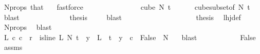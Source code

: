 \begin{isabellebody}
\ N{\isacharunderscore}{\kern0pt}props{\isacharparenleft}{\kern0pt}{}{\isacharparenright}{\kern0pt}\ that\ {}\ \isamarkupfalse%
\ fastforce\ \ \isanewline
\ \ \ \ \ \ \ \ \ \ \isamarkupfalse%
\ \isamarkupfalse%
\ {\isachardoublequoteopen}cube\ N{\isacharprime}{\kern0pt}\ {\isacharparenleft}{\kern0pt}t\ {\isacharplus}{\kern0pt}\ {}{\isacharparenright}{\kern0pt}\ {\isasymnoteq}\ {\isacharbraceleft}{\kern0pt}{\isacharbraceright}{\kern0pt}{\isachardoublequoteclose}\ \isamarkupfalse%
\ cube{\isacharunderscore}{\kern0pt}subset{\isacharbrackleft}{\kern0pt}of\ N{\isacharprime}{\kern0pt}\ t{\isacharbrackright}{\kern0pt}\ \isamarkupfalse%
\ blast\isanewline
\ \ \ \ \ \ \ \ \ \ \isamarkupfalse%
\ \isamarkupfalse%
\ {\isacharquery}{\kern0pt}thesis\ \isamarkupfalse%
\ {}\ \isamarkupfalse%
\ blast\isanewline
\ \ \ \ \ \ \ \ \isamarkupfalse%
\isanewline
\ \ \ \ \ \ \ \ \isamarkupfalse%
\ \isamarkupfalse%
\ {\isacharquery}{\kern0pt}thesis\ \isamarkupfalse%
\ lhj{\isacharunderscore}{\kern0pt}def\ \isamarkupfalse%
\ N{\isacharunderscore}{\kern0pt}props{\isacharparenleft}{\kern0pt}{}{\isacharparenright}{\kern0pt}\ \isamarkupfalse%
\ blast\isanewline
\ \ \ \ \ \ \isamarkupfalse%
\isanewline
\ \ \ \ \ \ \ \ \isamarkupfalse%
\ {}\isanewline
\ \ \ \ \ \ \ \ \isamarkupfalse%
\ \isamarkupfalse%
\ {\isachardoublequoteopen}{\isacharparenleft}{\kern0pt}{\isasymexists}L\ c{\isachardot}{\kern0pt}\ c\ {\isacharless}{\kern0pt}\ r\ {\isasymand}\ is{\isacharunderscore}{\kern0pt}line\ L\ N{\isacharprime}{\kern0pt}\ t\ {\isasymand}\ {\isacharparenleft}{\kern0pt}{\isasymforall}y\ {\isasymin}\ L\ {\isacharbackquote}{\kern0pt}\ {\isacharbraceleft}{\kern0pt}{\isachardot}{\kern0pt}{\isachardot}{\kern0pt}{\isacharless}{\kern0pt}t{\isacharbraceright}{\kern0pt}{\isachardot}{\kern0pt}\ {\isasymchi}\ y\ {\isacharequal}{\kern0pt}\ c{\isacharparenright}{\kern0pt}{\isacharparenright}{\kern0pt}\ {\isasymLongrightarrow}\ False{\isachardoublequoteclose}\ \ N{\isacharprime}{\kern0pt}\ {\isasymchi}\ \isamarkupfalse%
\ blast\isanewline
\ \ \ \ \ \ \ \ \isamarkupfalse%
\ \isamarkupfalse%
\ False\ \isamarkupfalse%
\ assms\ {}\ \isamarkupfalse%

\end{isabellebody}
